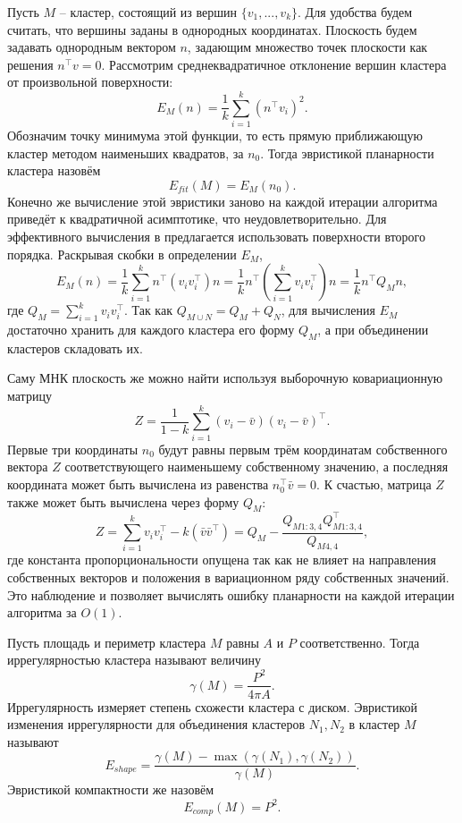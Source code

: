 \documentclass[12pt]{extarticle}
\begin{document}
Пусть $M$ -- кластер, состоящий из вершин $\{v_1, ..., v_k\}$. Для удобства будем считать, что вершины заданы в однородных координатах. Плоскость будем задавать однородным вектором $n$, задающим множество точек плоскости как решения $n^\top v = 0$. Рассмотрим среднеквадратичное отклонение вершин кластера от произвольной поверхности:
\[
  E_M(n) = \frac{1}{k}\sum_{i=1}^k (n^\top v_i)^2.
\]
Обозначим точку минимума этой функции, то есть прямую приближающую кластер методом наименьших квадратов, за $n_0$. Тогда эвристикой планарности кластера назовём
\[
  E_{fit}(M) = E_M(n_0).
\]
Конечно же вычисление этой эвристики заново на каждой итерации алгоритма приведёт к квадратичной асимптотике, что неудовлетворительно. Для эффективного вычисления в \cite{garland2001} предлагается использовать поверхности второго порядка. Раскрывая скобки в определении $E_M$,
\[
  E_M(n) = \frac{1}{k}\sum_{i=1}^k n^\top(v_iv_i^\top) n
    = \frac{1}{k}n^\top\left(\sum_{i=1}^k v_iv_i^\top\right) n
    = \frac{1}{k}n^\top Q_M n,
\]
где $Q_M = \sum_{i=1}^k v_iv_i^\top$. Так как $Q_{M\cup N} = Q_M + Q_N$, для вычисления $E_M$ достаточно хранить для каждого кластера его форму $Q_M$, а при объединении кластеров складовать их.

Саму МНК плоскость же можно найти используя выборочную ковариационную матрицу
\[
  Z = \frac{1}{1-k}\sum_{i=1}^k (v_i - \bar v)(v_i - \bar v)^\top.
\]
Первые три координаты $n_0$ будут равны первым трём координатам собственного вектора $Z$ соответствующего наименьшему собственному значению, а последняя координата может быть вычислена из равенства $n_0^\top \bar v = 0$. К счастью, матрица $Z$ также может быть вычислена через форму $Q_M$:
\[
  Z = \sum_{i=1}^k v_iv_i^\top - k(\bar v \bar v^\top) = Q_M - \frac{Q_{M1:3,4}Q_{M1:3,4}^\top}{Q_{M4,4}},
\]
где константа пропорциональности опущена так как не влияет на направления собственных векторов и положения в вариационном ряду собственных значений. Это наблюдение и позволяет вычислять ошибку планарности на каждой итерации алгоритма за $O(1)$.

Пусть площадь и периметр кластера $M$ равны $A$ и $P$ соответственно. Тогда иррегулярностью кластера называют величину
\[
  \gamma(M) = \frac{P^2}{4\pi A}.
\]
Иррегулярность измеряет степень схожести кластера с диском. Эвристикой изменения иррегулярности для объединения кластеров $N_1, N_2$ в кластер $M$ называют
\[
  E_{shape} = \frac{\gamma(M) - \max(\gamma(N_1), \gamma(N_2))}{\gamma(M)}.
\]
Эвристикой компактности же назовём
\[
  E_{comp}(M) = P^2.
\]
\end{document}

